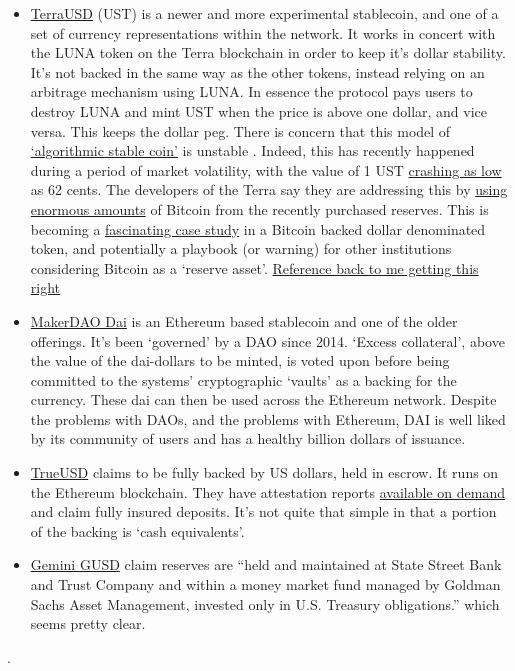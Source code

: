 \begin{itemize}
\item \href{https://assets.website-files.com/611153e7af981472d8da199c/618b02d13e938ae1f8ad1e45_Terra_White_paper.pdf}{TerraUSD} (UST) is a newer and more experimental stablecoin, and one of a set of currency representations within the network. It works in concert with the LUNA token on the Terra blockchain in order to keep it's dollar stability. It's not backed in the same way as the other tokens, instead relying on an arbitrage mechanism using LUNA. In essence the protocol pays users to destroy LUNA and mint UST when the price is above one dollar, and vice versa. This keeps the dollar peg. There is concern that this model of \href{https://mirror.xyz/damsondao.eth/OVeBrmrfcWm7uKLlA2Q4W1XTVkFU3cMKfNWhgf7mQuM}{`algorithmic stable coin'} is unstable \cite{clements2021built}. Indeed, this has recently happened during a period of market volatility, with the value of 1 UST \href{https://protos.com/heres-how-cryptos-third-largest-stablecoin-terra-ust-collapsed/}{crashing as low} as 62 cents. The developers of the Terra say they are addressing this by \href{https://etherscan.io/address/0xad41bd1cf3fd753017ef5c0da8df31a3074ea1ea}{using enormous amounts} of Bitcoin from the recently purchased reserves. This is becoming a \href{https://murrayrudd.substack.com/p/luna-price-model-update-22-feb-2022?s=r}{fascinating case study} in a Bitcoin backed dollar denominated token, and potentially a playbook (or warning) for other institutions considering Bitcoin as a `reserve asset'. \href{https://github.com/GMCyberFoundry/Metaverse/blob/b06547bf290392d2ff02e5142dae7386d888a9de/Book/04_money.tex#L186}{Reference back to me getting this right}  
\item \href{https://makerdao.com/en/whitepaper#abstract}{MakerDAO Dai} is an Ethereum based stablecoin and one of the older offerings. It's been `governed' by a DAO since 2014. `Excess collateral', above the value of the dai-dollars to be minted, is voted upon before being committed to the systems' cryptographic `vaults' as a backing for the currency. These dai can then be used across the Ethereum network. Despite the problems with DAOs, and the problems with Ethereum, DAI is well liked by its community of users and has a healthy billion dollars of issuance.
\item \href{https://trueusd.com/pdf/TUSD_WhitePaper.pdf}{TrueUSD} claims to be fully backed by US dollars, held in escrow. It runs on the Ethereum blockchain. They have attestation reports \href{https://real-time-attest.trustexplorer.io/truecurrencies}{available on demand} and claim fully insured deposits. It's not quite that simple in that a portion of the backing is `cash equivalents'.
\item \href{https://www.gemini.com/static/dollar/gemini-dollar-whitepaper.pdf}{Gemini GUSD} claim reserves are ``held and maintained at State Street Bank and Trust Company and within a money market fund managed by Goldman Sachs Asset Management, invested only in U.S. Treasury obligations.'' which seems pretty clear.
\end{itemize}  .

